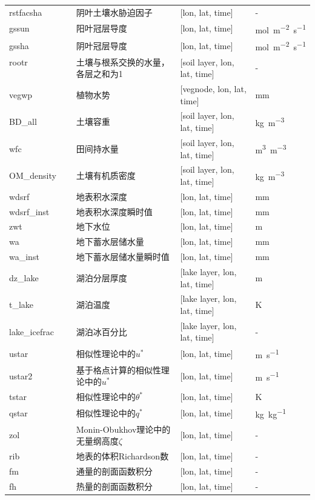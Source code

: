 \documentclass[a4paper,12pt,twoside]{article}
\begin{document}
{\begin{longtable}[htbp]{lp{}p{}l}
rstfacsha ~ ~ & 阴叶土壤水胁迫因子 & {[}lon, lat, time{]}  & - \\
gssun & 阳叶冠层导度 &  {[}lon, lat, time{]} & \unit{mol.m^{-2}.s^{-1}} \\
gssha & 阴叶冠层导度 &  {[}lon, lat, time{]} & \unit{mol.m^{-2}.s^{-1}} \\
rootr ~ ~ ~ ~ ~ ~ ~ & 土壤与根系交换的水量，各层之和为1 & {[}soil layer, lon, lat, time{]}  & - \\
vegwp & 植物水势 & {[}vegnode, lon, lat, time{]}  & mm \\ %
BD\_all & 土壤容重 &  {[}soil layer, lon, lat, time{]} & \unit{kg.m^{-3}} \\
wfc & 田间持水量 &  {[}soil layer, lon, lat, time{]} & \unit{m^{3}.m^{-3}} \\
OM\_density & 土壤有机质密度 &  {[}soil layer, lon, lat, time{]} & \unit{kg.m^{-3}} \\
wdsrf & 地表积水深度 & {[}lon, lat, time{]}  & mm \\
wdsrf\_inst & 地表积水深度瞬时值 & {[}lon, lat, time{]}  & mm \\
zwt & 地下水位 & {[}lon, lat, time{]}  & m \\
wa & 地下蓄水层储水量 & {[}lon, lat, time{]}  & mm \\
wa\_inst & 地下蓄水层储水量瞬时值 & {[}lon, lat, time{]}  & mm \\
dz\_lake & 湖泊分层厚度 & {[}lake layer, lon, lat, time{]}  & m \\
t\_lake & 湖泊温度 & {[}lake layer, lon, lat, time{]}  & K \\
lake\_icefrac & 湖泊冰百分比 & {[}lake layer, lon, lat, time{]} & - \\
ustar~ ~ & 相似性理论中的$u^*$ & {[}lon, lat, time{]}  & \unit{m.s^{-1}} \\
ustar2~ ~ & 基于格点计算的相似性理论中的$u^*$ & {[}lon, lat, time{]}  & \unit{m.s^{-1}} \\
tstar~ ~ & 相似性理论中的$\theta ^*$ & {[}lon, lat, time{]}  & K \\
qstar~ ~ & 相似性理论中的$q^*$ & {[}lon, lat, time{]}  & \unit{kg.kg^{-1}} \\
zol~ ~ ~ & Monin-Obukhov理论中的无量纲高度$\zeta$ & {[}lon, lat, time{]} & - \\
rib~ ~ ~ & 地表的体积Richardson数 & {[}lon, lat, time{]}  & - \\
fm ~ ~ ~ & 通量的剖面函数积分 & {[}lon, lat, time{]}  & - \\
fh ~ ~ ~ & 热量的剖面函数积分 & {[}lon, lat, time{]}  & - \\

\end{longtable}}
\end{document}
